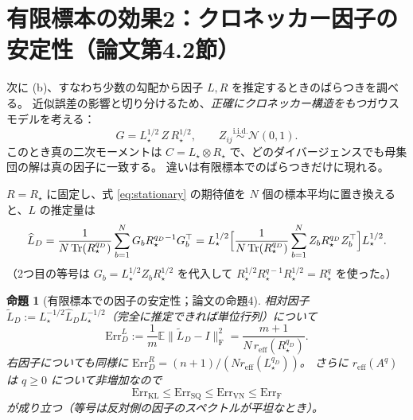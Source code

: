 \documentclass[a4paper,11pt]{ltjsarticle}
\theoremstyle{definition}
\theoremstyle{plain}
\newtheorem{proposition}[definition]{命題}
\newcommand{\E}{\mathbb{E}}
\DeclareMathOperator{\Tr}{Tr}
\newcommand{\reff}{r_{\mathrm{eff}}}
\newcommand{\norm}[1]{\lVert #1\rVert}
\newcommand{\Fro}{\mathrm{F}}
\newcommand{\T}{^{\top}}
\begin{document}
\section{有限標本の効果2：クロネッカー因子の安定性（論文第4.2節）}\label{sec:stability}

次に (b)、すなわち少数の勾配から因子 $L, R$ を推定するときのばらつきを調べる。
近似誤差の影響と切り分けるため、\emph{正確にクロネッカー構造をもつ}ガウスモデルを考える：
\begin{equation}\label{eq:kron-gauss}
  G = L_\star^{1/2}\,Z\,R_\star^{1/2},\qquad Z_{ij}\overset{\text{i.i.d.}}{\sim}\mathcal N(0,1).
\end{equation}
このとき真の二次モーメントは $C = L_\star\otimes R_\star$ で、どのダイバージェンスでも母集団の解は真の因子に一致する。
違いは有限標本でのばらつきだけに現れる。

$R = R_\star$ に固定し、式 \eqref{eq:stationary} の期待値を $N$ 個の標本平均に置き換えると、$L$ の推定量は
\begin{equation}\label{eq:Lhat}
  \widehat L_D = \frac{1}{N\Tr(R_\star^{q_D})}\sum_{b=1}^N G_bR_\star^{q_D-1}G_b\T
  = L_\star^{1/2}\Bigl[\frac{1}{N\Tr(R_\star^{q_D})}\sum_{b=1}^N Z_bR_\star^{q_D}Z_b\T\Bigr]L_\star^{1/2}.
\end{equation}
（2つ目の等号は $G_b = L_\star^{1/2}Z_bR_\star^{1/2}$ を代入して $R_\star^{1/2}R_\star^{q-1}R_\star^{1/2} = R_\star^q$ を使った。）

\begin{proposition}[有限標本での因子の安定性；論文の命題4]\label{prop:stability}
相対因子 $\widetilde L_D := L_\star^{-1/2}\widehat L_DL_\star^{-1/2}$（完全に推定できれば単位行列）について
\begin{equation}
  \mathrm{Err}^L_D := \frac1m\E\norm{\widetilde L_D - I}_\Fro^2 = \frac{m+1}{N\,\reff(R_\star^{q_D})} .
\end{equation}
右因子についても同様に $\mathrm{Err}^R_D = (n+1)/(N\reff(L_\star^{q_D}))$。
さらに $\reff(A^q)$ は $q\ge0$ について非増加なので
\begin{equation}
  \mathrm{Err}_{\mathrm{KL}}\le\mathrm{Err}_{\mathrm{SQ}}\le\mathrm{Err}_{\mathrm{VN}}\le\mathrm{Err}_{\mathrm F}
\end{equation}
が成り立つ（等号は反対側の因子のスペクトルが平坦なとき）。
\end{proposition}
\end{document}
